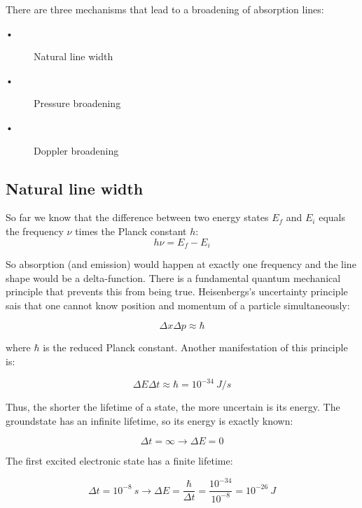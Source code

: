 There are three mechanisms that lead to a broadening of absorption lines:
\begin{description}
\item[•] Natural line width
\item[•] Pressure broadening
\item[•] Doppler broadening 
\end{description}

\subsection{Natural line width}

So far we know that the difference between two energy states $E_{f}$ and $E_{i}$ equals the frequency $\nu$ times the Planck constant $h$:
\begin{equation}
h \nu = E_f - E_i
\end{equation}

So absorption (and emission) would happen at exactly one frequency and the line shape would be a delta-function. There is a fundamental quantum mechanical principle that prevents this from being true. Heisenbergs's uncertainty principle sais that one cannot know position and momentum of a particle simultaneously: 

\begin{equation}
\Delta x \Delta p \approx \hbar
\end{equation}

where $\hbar$ is the reduced Planck constant. Another manifestation of this principle is:

\begin{equation}
\Delta E \Delta t \approx \hbar = 10^{-34}~J/s
\end{equation}

Thus, the shorter the lifetime of a state, the more uncertain is its energy. 
The groundstate has an infinite lifetime, so its energy is exactly known:

\begin{equation}
\Delta t = \infty \rightarrow \Delta E = 0
\end{equation}

The first excited electronic state has a finite lifetime:

\begin{equation}
\Delta t = 10^{-8}~s \rightarrow \Delta E = \frac{\hbar}{\Delta t} = \frac{10^{-34}}{10^{-8}} = 10^{-26}~J
\end{equation}


